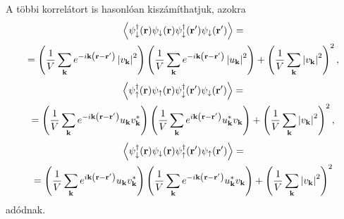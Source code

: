 \documentclass[a4paper,12pt,titlepage]{article}
\newcommand{\KK}{{\vb{k}}}
\newcommand{\RR}{{\vb{r}}}
\begin{document}
A többi korrelátort is hasonlóan kiszámíthatjuk, azokra
\begin{multline}
	\left< \psi_\downarrow^\dagger(\RR) \psi_\downarrow(\RR) \psi_\downarrow^\dagger(\RR^\prime) \psi_\downarrow(\RR^\prime) \right> = \\
	= \left( \frac{1}{V} \sum\limits_\KK e^{-i \KK \left( \RR - \RR^\prime \right)} \left| v_\KK \right|^2 \right) \left( \frac{1}{V} \sum\limits_\KK e^{-i \KK \left( \RR - \RR^\prime \right)} \left| u_\KK \right|^2 \right) + \left( \frac{1}{V} \sum\limits_\KK \left| v_\KK \right|^2 \right)^2,
\end{multline}
\begin{multline}
	\left< \psi_\uparrow^\dagger(\RR) \psi_\uparrow(\RR) \psi_\downarrow^\dagger(\RR^\prime) \psi_\downarrow(\RR^\prime) \right> = \\
	= \left( \frac{1}{V} \sum\limits_\KK e^{-i \KK \left( \RR - \RR^\prime \right)} u_\KK v_\KK^* \right) \left( \frac{1}{V} \sum\limits_\KK e^{i \KK \left( \RR - \RR^\prime \right)} u_\KK^* v_\KK \right) + \left( \frac{1}{V} \sum\limits_\KK \left| v_\KK \right|^2 \right)^2,
\end{multline}
\begin{multline}
	\left< \psi_\downarrow^\dagger(\RR) \psi_\downarrow(\RR) \psi_\uparrow^\dagger(\RR^\prime) \psi_\uparrow(\RR^\prime) \right> = \\
	= \left( \frac{1}{V} \sum\limits_\KK e^{i \KK \left( \RR - \RR^\prime \right)} u_\KK v_\KK^* \right) \left( \frac{1}{V} \sum\limits_\KK e^{-i \KK \left( \RR - \RR^\prime \right)} u_\KK^* v_\KK \right) + \left( \frac{1}{V} \sum\limits_\KK \left| v_\KK \right|^2 \right)^2
\end{multline}
adódnak.
\end{document}
